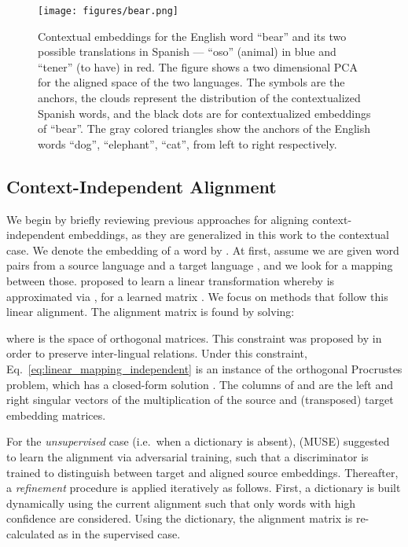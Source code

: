 \documentclass[11pt,a4paper]{article}
\renewcommand{\eqref}[1]{Eq.~\ref{#1}}
\begin{document}
\begin{figure}[t]
\centering

  \texttt{[image: figures/bear.png]}
  \caption{Contextual embeddings for the English word ``bear'' and its two possible translations in Spanish ---  ``oso'' (animal) in blue and  ``tener'' (to have) in red. The figure shows a two dimensional PCA for the aligned space of the two languages. The symbols are the anchors, the clouds represent the distribution of the contextualized Spanish words, and the black dots are for contextualized embeddings of ``bear''. The gray colored triangles show the anchors of the English words ``dog'', ``elephant'', ``cat'', from left to right respectively. 
}   \label{fig:bear}
\end{figure}


\subsection{Context-Independent Alignment \label{sec:mikolov}}

We begin by briefly reviewing previous approaches for 
aligning context-independent embeddings, as they are generalized in this work to the contextual case. We denote the embedding of a word  by . At first, assume we are given word pairs  from a source language  and a target language , and we look for a mapping between those.  \citet{mikolov2013exploiting} proposed to learn a linear transformation whereby  is approximated via , for a learned matrix . We focus on methods that follow this linear alignment.
The alignment matrix is found by solving:


\noindent where  is the space of orthogonal matrices. This constraint was proposed by \citet{xing2015normalized}  in order to preserve inter-lingual relations.
Under this constraint, \eqref{eq:linear_mapping_independent} is an instance of the orthogonal Procrustes problem, which has a closed-form solution . The columns of  and  are the left and right singular vectors of the multiplication of the source and (transposed) target embedding matrices.



For the \emph{unsupervised} case (i.e.\ when a dictionary is absent), \citet{conneau2017word} (MUSE) suggested to learn the alignment via adversarial training, such that a discriminator is trained to distinguish between target and aligned source embeddings. Thereafter, a \emph{refinement} procedure is applied iteratively as follows. First, a dictionary is built dynamically using the current alignment such that only words with high confidence are considered. Using the dictionary, the alignment matrix is re-calculated as in the supervised case.
\end{document}
